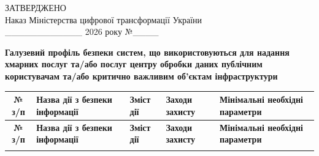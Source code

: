 \documentclass[10pt]{article}
\begin{document}
\begin{flushright}
ЗАТВЕРДЖЕНО\\
Наказ Міністерства цифрової трансформації України\\
\_\_\_\_\_\_\_\_\_\_\_\_ 2026 року №\_\_\_\_
\end{flushright}

\begin{center}
\textbf{\large Галузевий профіль безпеки систем, що використовуються для надання хмарних послуг та/або послуг центру обробки даних публічним користувачам та/або критично важливим об’єктам інфраструктури}
\end{center}

\footnotesize
\begin{longtable}{|c|>{\raggedright\arraybackslash}p{2.5cm}|>{\raggedright\arraybackslash}p{4cm}|>{\raggedright\arraybackslash}p{3.5cm}|>{\raggedright\arraybackslash}p{5.5cm}|}
\hline
\textbf{№ з/п} & \textbf{Назва дії з безпеки інформації} & \textbf{Зміст дії} & \textbf{Заходи захисту} & \textbf{Мінімальні необхідні параметри}\\
\hline
\endfirsthead

\hline
\textbf{№ з/п} & \textbf{Назва дії з безпеки інформації} & \textbf{Зміст дії} & \textbf{Заходи захисту} & \textbf{Мінімальні необхідні параметри}\\
\hline
\endhead

\hline
\endfoot

\hline
\endlastfoot


\end{longtable}
\end{document}
